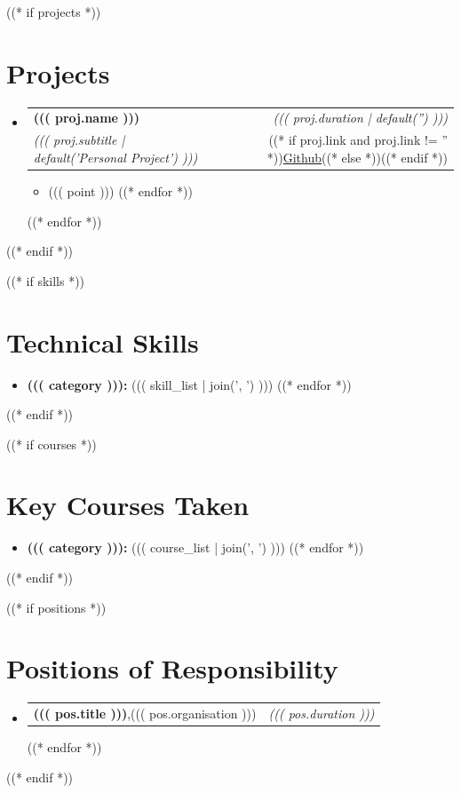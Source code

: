 \documentclass[a4paper,11pt]{article}
\makeatletter
\newcommand{\resumeProject}[4]{
\vspace{0.5mm}\item
    \begin{tabular*}{0.98\textwidth}[t]{l@{\extracolsep{\fill}}r}
        \textbf{#1} & \textit{\small #3} \\
        \textit{\small #2} & \small #4 \\
    \end{tabular*}
    \vspace{-2.4mm}
}
\newcommand{\resumePOR}[3]{
\vspace{0.5mm}\item
    \begin{tabular*}{0.97\textwidth}[t]{l@{\extracolsep{\fill}}r}
        \textbf{#1},\hspace{0.3mm}#2 & \textit{\small #3}
    \end{tabular*}
    \vspace{-2mm}
}
\newcommand{\resumeSubHeadingListStart}{\begin{itemize}[leftmargin=*,labelsep=1.5mm]}
\newcommand{\resumeSubHeadingListEnd}{\end{itemize}\vspace{2mm}}
\newcommand{\resumeItemListStart}{
    \begin{justify}
    \begin{itemize}[leftmargin=3ex, rightmargin=2ex, noitemsep, labelsep=1.2mm, itemsep=0mm]
    \small
}
\newcommand{\resumeItemListEnd}{\end{itemize}\end{justify}\vspace{-2mm}}
\newcommand{\resumeHeadingSkillStart}{\begin{itemize}[leftmargin=*,itemsep=1.7mm, rightmargin=2ex]}
\newcommand{\resumeHeadingSkillEnd}{\end{itemize}\vspace{-2mm}}
\makeatother
\begin{document}
((* if projects *))
\section{Projects}
\resumeSubHeadingListStart
  ((* for proj in projects *))
  \resumeProject
    {((( proj.name )))}
    {((( proj.subtitle | default('Personal Project') )))}
    {((( proj.duration | default('') )))}
    {((* if proj.link and proj.link != '' *))\href{https://((( proj.link )))}{Github}((* else *)){}((* endif *))}
    \resumeItemListStart
      ((* for point in proj.points *))
      \item {((( point )))}
      ((* endfor *))
    \resumeItemListEnd
  ((* endfor *))
\resumeSubHeadingListEnd
\vspace{-5.5mm}
((* endif *))

((* if skills *))
\section{Technical Skills}
\resumeHeadingSkillStart
  ((* for category, skill_list in skills.items() *))
  \item \textbf{((( category ))): }((( skill_list | join(', ') )))
  ((* endfor *))
\resumeHeadingSkillEnd
\vspace{-1mm}
((* endif *))

((* if courses *))
\section{Key Courses Taken}
\resumeHeadingSkillStart
  ((* for category, course_list in courses.items() *))
  \item \textbf{((( category ))): }((( course_list | join(', ') )))
  ((* endfor *))
\resumeHeadingSkillEnd
\vspace{-1mm}
((* endif *))

((* if positions *))
\section{Positions of Responsibility}
\vspace{-0.4mm}
\resumeSubHeadingListStart
  ((* for pos in positions *))
  \resumePOR{((( pos.title )))}
    {((( pos.organisation )))}
    {((( pos.duration )))}
  ((* endfor *))
\resumeSubHeadingListEnd
\vspace{-4mm}
((* endif *))
\end{document}
